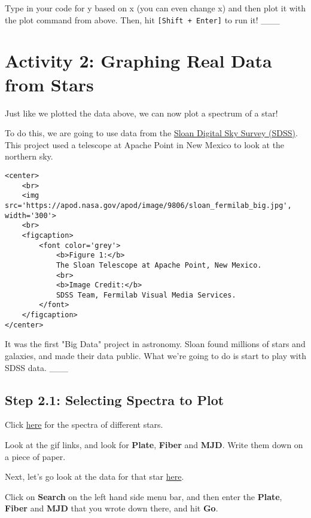 \documentclass[11pt]{article}
\begin{document}
Type in your code for y based on x (you can even change x) and then plot
it with the plot command from above. Then, hit
\texttt{{[}Shift\ +\ Enter{]}} to run it! \_\_\_

    \section{Activity 2: Graphing Real Data from
Stars}\label{activity-2-graphing-real-data-from-stars}

Just like we plotted the data above, we can now plot a spectrum of a
star!

To do this, we are going to use data from the
\href{http://sdss.org}{Sloan Digital Sky Survey (SDSS)}. This project
used a telescope at Apache Point in New Mexico to look at the northern
sky.

\begin{verbatim}
<center>
    <br>
    <img src='https://apod.nasa.gov/apod/image/9806/sloan_fermilab_big.jpg', width='300'>
    <br>
    <figcaption>
        <font color='grey'>
            <b>Figure 1:</b>
            The Sloan Telescope at Apache Point, New Mexico.
            <br>
            <b>Image Credit:</b>
            SDSS Team, Fermilab Visual Media Services.
        </font>
    </figcaption>
</center>
\end{verbatim}

It was the first "Big Data" project in astronomy. Sloan found millions
of stars and galaxies, and made their data public. What we're going to
do is start to play with SDSS data. \_\_\_

    \subsection{Step 2.1: Selecting Spectra to
Plot}\label{step-2.1-selecting-spectra-to-plot}

Click \href{http://classic.sdss.org/dr5/algorithms/spectemplates/}{here}
for the spectra of different stars.

Look at the gif links, and look for \textbf{Plate}, \textbf{Fiber} and
\textbf{MJD}. Write them down on a piece of paper.

Next, let's go look at the data for that star
\href{http://cas.sdss.org/dr14/en/tools/explore/Summary.aspx}{here}.

Click on \textbf{Search} on the left hand side menu bar, and then enter
the \textbf{Plate}, \textbf{Fiber} and \textbf{MJD} that you wrote down
there, and hit \textbf{Go}.
\end{document}
